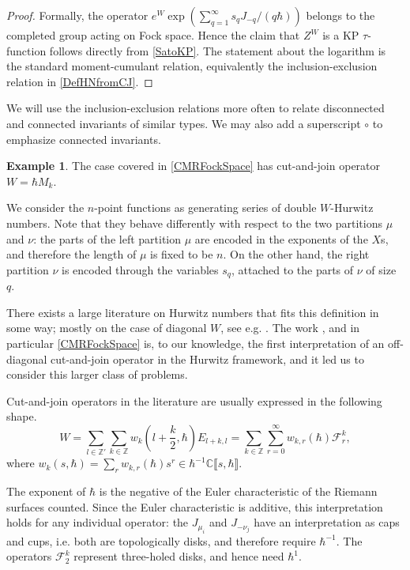 \documentclass[10pt,a4paper,oneside,no-math,reqno]{amsart}%
\theoremstyle{plain}
\theoremstyle{definition}
\newtheorem{example}[theorem]{Example}
\theoremstyle{remark}
\numberwithin{equation}{section}
\newcommand{\mb}[1]{\mathbb{#1}}
\newcommand{\mc}[1]{\mathcal{#1}}
\newcommand{\1}{\mathds{1}}
\newcommand{\C}{\mb{C}}
\newcommand{\Z}{\mb{Z}}
\newcommand{\<}{\langle}
\renewcommand{\>}{\rangle}
\begin{document}
\begin{proof}
    Formally, the operator $e^W \exp(\sum_{q=1}^\infty s_q J_{-q}/(q\hbar))$ belongs to the completed group acting on Fock space. Hence the claim that $Z^W$ is a KP $\tau$-function follows directly from \cref{SatoKP}. The statement about the logarithm is the standard moment-cumulant relation, equivalently the inclusion-exclusion relation in \cref{DefHNfromCJ}.
\end{proof}

We will use the inclusion-exclusion relations more often to relate disconnected and connected invariants of similar types. We may also add a superscript $ \circ$ to emphasize connected invariants.

\begin{example}
    The case covered in \cref{CMRFockSpace} has cut-and-join operator $ W = \hbar M_k$.
\end{example}

We consider the $n$-point functions as generating series of double $W$-Hurwitz numbers. Note that they behave differently with respect to the two partitions $ \mu$ and $\nu$: the parts of the left partition $ \mu$ are encoded in the exponents of the $ X$s, and therefore the length of $ \mu $ is fixed to be $n$. On the other hand, the right partition $ \nu$ is encoded through the variables $ s_q$, attached to the parts of $\nu$ of size $ q$.

There exists a large literature on Hurwitz numbers that fits this definition in some way; mostly on the case of diagonal $W$, see e.g. \cite{ALS16,BDKS22,BDKS24}. The work \cite{CMR25}, and in particular \cref{CMRFockSpace} is, to our knowledge, the first interpretation of an off-diagonal cut-and-join operator in the Hurwitz framework, and it led us to consider this larger class of problems.

Cut-and-join operators in the literature are usually expressed in the following shape.
\begin{equation}
	W
	=
	\sum_{l \in \Z'} \sum_{k \in \Z} w_k (l + \frac{k}{2}, \hbar)  E_{l + k,l} 
    =
    \sum_{k \in \Z} \sum_{r = 0}^\infty w_{k,r} (\hbar ) \mc{F}_r^k ,
\end{equation}
where $ w_k (s, \hbar )  = \sum_r w_{k,r} (\hbar) s^r \in \hbar^{-1} \C \llbracket s, \hbar \rrbracket$.

The exponent of $ \hbar $ is the negative of the Euler characteristic of the Riemann surfaces counted. Since the Euler characteristic is additive, this interpretation holds for any individual operator: the $ J_{\mu_i}$ and $ J_{-\nu_j}$ have an interpretation as caps and cups, i.e. both are topologically disks, and therefore require $ \hbar^{-1}$. The operators $ \mc{F}_2^k$ represent three-holed disks, and hence need $ \hbar^1$.
\end{document}
